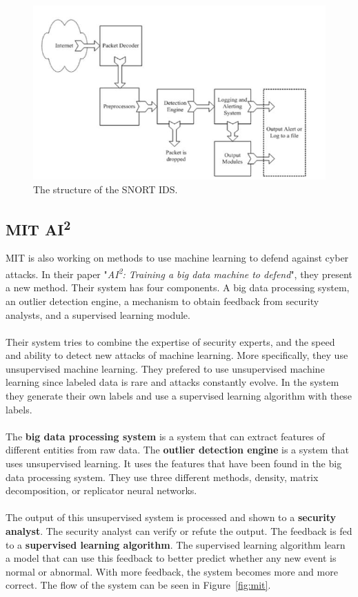 \begin{figure}[H]
\centering
\includegraphics[width=1\textwidth]{Figures/snort}
\decoRule
\caption[The structure of the SNORT IDS]{The structure of the SNORT IDS. \cite{snortImg}}
\label{fig:snort}
\end{figure}

\subsection{MIT AI\textsuperscript{2}}
\label{mitpaper}
MIT is also working on methods to use machine learning to defend against cyber attacks. In their paper "\textit{AI\textsuperscript{2}: Training a big data machine to defend}", they present a new method. Their system has four components. A big data processing system, an outlier detection engine, a mechanism to obtain feedback from security analysts, and a supervised learning module.
\cite{veeramachaneniai2}\\
\\
Their system tries to combine the expertise of security experts, and the speed and ability to detect new attacks of machine learning. More specifically, they use unsupervised machine learning. They prefered to use unsupervised machine learning since labeled data is rare and attacks constantly evolve. In the system they generate their own labels and use a supervised learning algorithm with these labels. \\
\\
The \textbf{big data processing system} is a system that can extract features of different entities from raw data. The \textbf{outlier detection engine} is a system that uses unsupervised learning. It uses the features that have been found in the big data processing system. They use three different methods, density, matrix decomposition, or replicator neural networks. \cite{veeramachaneniai2} \\
\\
The output of this unsupervised system is processed and shown to a \textbf{security analyst}. The security analyst can verify or refute the output. The feedback is fed to a \textbf{supervised learning algorithm}. The supervised learning algorithm learn a model that can use this feedback to better predict whether any new event is normal or abnormal. With more feedback, the system becomes more and more correct. The flow of the system can be seen in Figure~\ref{fig:mit}. \cite{veeramachaneniai2}

